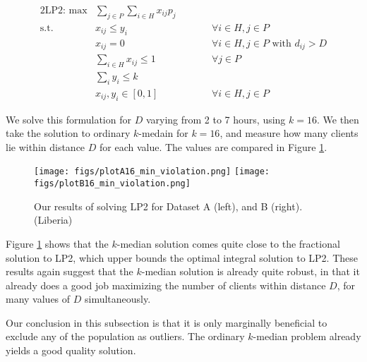 \begin{alignat}{2}
\text{LP2: max}  &\sum_{j\in P}\sum_{i\in H} x_{ij}p_j  && \nonumber\\
\label{eqn:violationsA1}
\text{s.t. } &x_{ij} \leq y_i &\qquad & \forall i\in H, j\in P\\
\label{eqn:violationsA2}
& x_{ij} = 0 &\qquad & \forall i\in H, j\in P \mbox{ with }d_{ij}>D\\
\label{eqn:violationsA3}
& \sum_{i\in H} x_{ij} \le 1  &\qquad & \forall j\in P\\
\label{eqn:violationsA4}
&\sum_i y_i \leq k\\
\label{eqn:violationsA5}
&x_{ij}, y_i \in[0,1] &\qquad & \forall i\in H, j\in P
\end{alignat}

We solve this formulation for $D$ varying from 2 to 7 hours, using $k=16$. We then take the solution to ordinary $k$-medain for $k=16$, and measure how many clients lie within distance $D$ for each value. The values are compared in Figure \ref{fig:LP2_AB}. 

\begin{figure}[h]
  \centering %
    \texttt{[image: figs/plotA16\_min\_violation.png]}
	\texttt{[image: figs/plotB16\_min\_violation.png]}
\caption{Our results of solving LP2 for Dataset A (left), and B (right). (Liberia)} 
	\label{fig:LP2_AB}
\end{figure}

Figure \ref{fig:LP2_AB} shows that the $k$-median solution comes quite close to the fractional solution to LP2, which upper bounds the optimal integral solution to LP2. These results again suggest that the $k$-median solution is already quite robust, in that it already does a good job maximizing the number of clients within distance $D$, for many values of $D$ simultaneously. 

Our conclusion in this subsection is that it is only marginally beneficial to exclude any of the population as outliers. The ordinary $k$-median problem already yields a good quality solution. 

